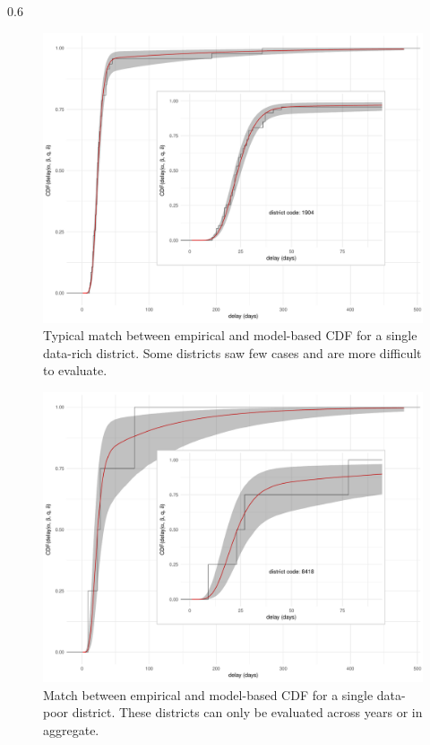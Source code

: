 \documentclass[final]{beamer}
\newlength{\onecolwid}
\begin{document}
\begin{frame}[t]
\begin{columns}[t]
\begin{column}{0.6\onecolwid}
\begin{figure}
 \begin{center}
    \includegraphics[width=.8\textwidth]{district-plot-126}
 \end{center}
 \caption{\small Typical match between empirical and model-based CDF for a single data-rich district.  Some districts saw few cases and are more difficult to evaluate.}
\end{figure}


\vspace{0.5in}

\begin{figure}
 \begin{center}
    \includegraphics[width=.8\textwidth]{district-plot-884}
 \end{center}
 \caption{\small Match between empirical and model-based CDF for a single data-poor district.  These districts can only be evaluated across years or in aggregate.}
\end{figure}



\end{column}
\end{columns}
\end{frame}
\end{document}
